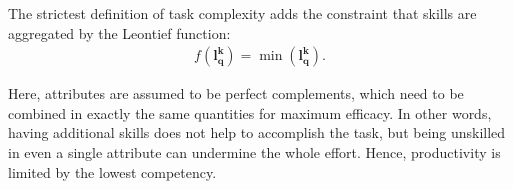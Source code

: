 {\begin{definition}
\begin{subdefinition}
        \end{subdefinition}
        
        \begin{subdefinition}
            The strictest definition of task complexity adds the constraint that skills are aggregated by the Leontief function:
            \begin{gather}
                f(\boldsymbol{l_{q}^{k}}) = 
                \min(\boldsymbol{l_{q}^{k}})
                .
            \end{gather}

            Here, attributes are assumed to be perfect complements, which need to be combined in exactly the same quantities for maximum efficacy. In other words, having additional skills does not help to accomplish the task, but being unskilled in even a single attribute can undermine the whole effort. Hence, productivity is limited by the lowest competency.
        \end{subdefinition}

    \end{definition}
}


\newcommand{\SCL}{
    \label{scl}

    \begin{lemma}[Skill Composition Lemma]
        The Skill Composition Lemma (SCL) is a generalization of the SSL and states that skills are composable to accomplish complex tasks. More precisely, let $T_{q}^{l}$ be an activity of difficulty level $l$ that requires the $\boldsymbol{a_q} = (a_{1}^{q}, \dots, a_{m}^{q})$ skill set (i.e. $T_{q}^{l}$ is a complex task). With this, we demonstrate that any rational and sufficiently qualified economic agent can naturally ``piece together'', that is \textit{compose}, attributes $\{1, \dots, m\}$ to accomplish the $T_{q}^{l}$ complex task.
        
        \begin{proof}
            Given 
            \begin{gather}
                \tilde{T}_{q}^{k} = 
                \int_{0}^{1}{
                    T(l, l_{q}^{k})
                    dl
                }
            \end{gather}
        \end{proof}
    \end{lemma}
}

